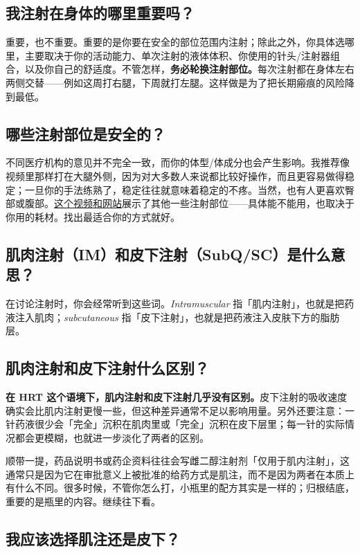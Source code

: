 \documentclass{article}
\begin{document}
\subsection{我注射在身体的哪里重要吗？}

重要，也不重要。重要的是你要在安全的部位范围内注射；除此之外，你具体选哪里，主要取决于你的活动能力、单次注射的液体体积、你使用的针头/注射器组合，以及你自己的舒适度。不管怎样，\textbf{务必轮换注射部位。}每次注射都在身体左右两侧交替——例如这周打右腿，下周就打左腿。这样做是为了把长期瘢痕的风险降到最低。

\subsection{哪些注射部位是安全的？}

不同医疗机构的意见并不完全一致，而你的体型/体成分也会产生影响。我推荐像视频里那样打在大腿外侧，因为对大多数人来说都比较好操作，而且更容易做得稳定；一旦你的手法练熟了，稳定往往就意味着稳定的不疼。当然，也有人更喜欢臀部或腹部。\href{https://vertisis.com/articles/how-to-self-administer-a-subcutaneous-injection}{这个视频和网站}展示了其他一些注射部位——具体能不能用，也取决于你用的耗材。找出最适合你的方式就好。

\subsection{肌肉注射（IM）和皮下注射（SubQ/SC）是什么意思？}

在讨论注射时，你会经常听到这些词。\textit{Intramuscular} 指「肌内注射」，也就是把药液注入肌肉；\textit{subcutaneous} 指「皮下注射」，也就是把药液注入皮肤下方的脂肪层。

\subsection{肌肉注射和皮下注射什么区别？}

\textbf{在 HRT 这个语境下，肌内注射和皮下注射几乎没有区别。}皮下注射的吸收速度确实会比肌内注射更慢一些，但这种差异通常不足以影响用量。另外还要注意：一针药液很少会「完全」沉积在肌肉里或「完全」沉积在皮下层里；每一针的实际情况都会更模糊，也就进一步淡化了两者的区别。

顺带一提，药品说明书或药企资料往往会写雌二醇注射剂「仅用于肌内注射」，这通常只是因为它在审批意义上被批准的给药方式是肌注，而不是因为两者在本质上有什么不同。很多时候，不管你怎么打，小瓶里的配方其实是一样的；归根结底，重要的是瓶里的内容。继续往下看。

\subsection{我应该选择肌注还是皮下？}
\end{document}
